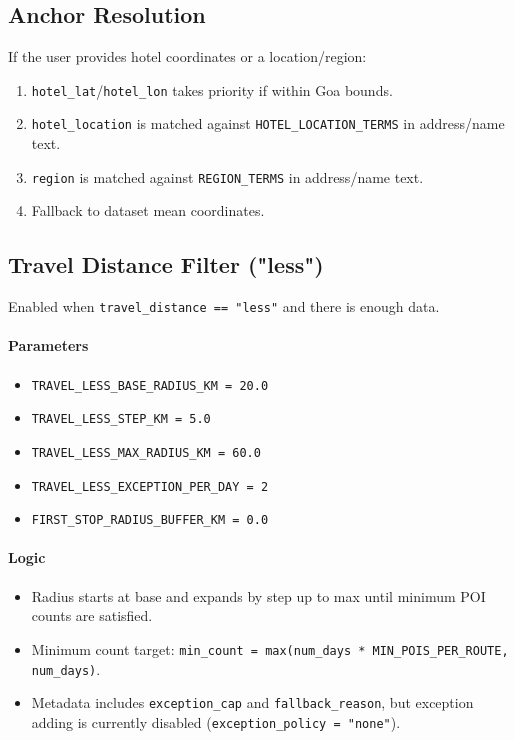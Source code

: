 \documentclass[11pt]{article}
\begin{document}
\subsection{Anchor Resolution}
If the user provides hotel coordinates or a location/region:
\begin{enumerate}
  \item \texttt{hotel\_lat}/\texttt{hotel\_lon} takes priority if within Goa bounds.
  \item \texttt{hotel\_location} is matched against \texttt{HOTEL\_LOCATION\_TERMS} in address/name text.
  \item \texttt{region} is matched against \texttt{REGION\_TERMS} in address/name text.
  \item Fallback to dataset mean coordinates.
\end{enumerate}

\subsection{Travel Distance Filter ("less")}
Enabled when \texttt{travel\_distance == "less"} and there is enough data.

\paragraph{Parameters}
\begin{itemize}
  \item \texttt{TRAVEL\_LESS\_BASE\_RADIUS\_KM = 20.0}
  \item \texttt{TRAVEL\_LESS\_STEP\_KM = 5.0}
  \item \texttt{TRAVEL\_LESS\_MAX\_RADIUS\_KM = 60.0}
  \item \texttt{TRAVEL\_LESS\_EXCEPTION\_PER\_DAY = 2}
  \item \texttt{FIRST\_STOP\_RADIUS\_BUFFER\_KM = 0.0}
\end{itemize}

\paragraph{Logic}
\begin{itemize}
  \item Radius starts at base and expands by step up to max until minimum POI counts are satisfied.
  \item Minimum count target: \texttt{min\_count = max(num\_days * MIN\_POIS\_PER\_ROUTE, num\_days)}.
  \item Metadata includes \texttt{exception\_cap} and \texttt{fallback\_reason}, but exception adding is currently disabled (\texttt{exception\_policy = "none"}).
\end{itemize}
\end{document}
